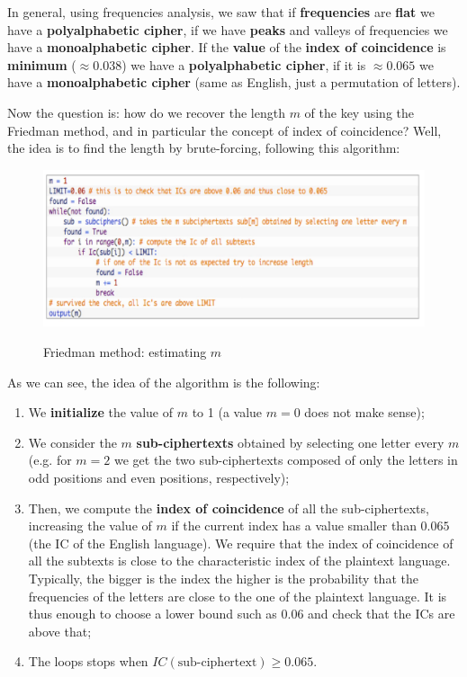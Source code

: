 In general, using frequencies analysis, we saw that if \textbf{frequencies} are \textbf{flat} we have a \textbf{polyalphabetic cipher}, if we have \textbf{peaks} and valleys of frequencies we have a \textbf{monoalphabetic cipher}. If the \textbf{value} of the \textbf{index of coincidence} is \textbf{minimum} ($\approx 0.038$) we have a \textbf{polyalphabetic cipher}, if it is $\approx 0.065$ we have a \textbf{monoalphabetic cipher} (same as English, just a permutation of letters).

Now the question is: how do we recover the length $m$ of the key using the Friedman method, and in particular the concept of index of coincidence? Well, the idea is to find the length by brute-forcing, following this algorithm:

\begin{figure}[h!]
        \centering
        \includegraphics[scale = 0.9]{img/poly2.jpg}
        \label{poly2}
        \caption{Friedman method: estimating $m$}
\end{figure}

As we can see, the idea of the algorithm is the following:

\begin{enumerate}
    \item We \textbf{initialize} the value of $m$ to 1 (a value $m = 0$ does not make sense);
    \item We consider the $m$ \textbf{sub-ciphertexts} obtained by selecting one letter every $m$ (e.g. for $m = 2$ we get the two sub-ciphertexts composed of only the letters in odd positions and even positions, respectively);
    \item Then, we compute the \textbf{index of coincidence} of all the sub-ciphertexts, increasing the value of $m$ if the current index has a value smaller than $0.065$ (the IC of the English language). We require that the index of coincidence of all the subtexts is close to the characteristic index of the plaintext language. Typically, the bigger is the index the higher is the probability that the frequencies of the letters are close to the one of the plaintext language. It is thus enough to choose a lower bound such as 0.06 and check that the ICs are above that;
    \item The loops stops when $IC(\text{sub-ciphertext}) \geq 0.065$.
\end{enumerate}

